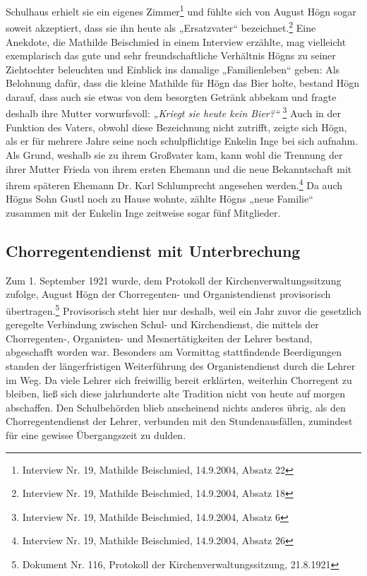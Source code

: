 \documentclass[a4paper]{article}
\newcommand\textstyleZitate[1]{\textit{#1}}
\begin{document}
Schulhaus erhielt sie ein eigenes Zimmer\footnote{ Interview Nr. 19,
Mathilde Beischmied, 14.9.2004, Absatz 22} und fühlte sich von August
Högn sogar soweit akzeptiert, dass sie ihn heute als „Ersatzvater“
bezeichnet.\footnote{ Interview Nr. 19, Mathilde Beischmied, 14.9.2004,
Absatz 18} Eine Anekdote, die Mathilde Beischmied in einem Interview
erzählte, mag vielleicht exemplarisch das gute und sehr
freundschaftliche Verhältnis Högns zu seiner Ziehtochter beleuchten und
Einblick ins damalige „Familienleben“ geben: Als Belohnung dafür, dass
die kleine Mathilde für Högn das Bier holte, bestand Högn darauf, dass
auch sie etwas von dem besorgten Getränk abbekam und fragte deshalb
ihre Mutter vorwurfsvoll: \textstyleZitate{„Kriegt sie heute kein
Bier?“ }\footnote{ Interview Nr. 19, Mathilde Beischmied, 14.9.2004,
Absatz 6} Auch in der Funktion des Vaters, obwohl diese Bezeichnung
nicht zutrifft, zeigte sich Högn, als er für mehrere Jahre seine noch
schulpflichtige Enkelin Inge bei sich aufnahm. Als Grund, weshalb sie
zu ihrem Großvater kam, kann wohl die Trennung der ihrer Mutter Frieda
von ihrem ersten Ehemann und die neue Bekanntschaft mit ihrem späteren
Ehemann Dr. Karl Schlumprecht angesehen werden.\footnote{ Interview Nr.
19, Mathilde Beischmied, 14.9.2004, Absatz 26} Da auch Högns Sohn Gustl
noch zu Hause wohnte, zählte Högns „neue Familie“ zusammen mit der
Enkelin Inge zeitweise sogar fünf Mitglieder.

\subsection{Chorregentendienst mit Unterbrechung}
\hypertarget{RefHeadingToc100333732}{}Zum 1. September 1921 wurde, dem
Protokoll der Kirchenverwaltungssitzung zufolge, August Högn der
Chorregenten- und Organistendienst provisorisch übertragen.\footnote{
Dokument Nr. 116, Protokoll der Kirchenverwaltungssitzung, 21.8.1921}
Provisorisch steht hier nur deshalb, weil ein Jahr zuvor die gesetzlich
geregelte Verbindung zwischen Schul- und Kirchendienst, die mittels der
Chorregenten-, Organisten- und Mesnertätigkeiten der Lehrer bestand,
abgeschafft worden war. Besonders am Vormittag stattfindende
Beerdigungen standen der längerfristigen Weiterführung des
Organistendienst durch die Lehrer im Weg. Da viele Lehrer sich
freiwillig bereit erklärten, weiterhin Chorregent zu bleiben, ließ sich
diese jahrhunderte alte Tradition nicht von heute auf morgen
abschaffen. Den Schulbehörden blieb anscheinend nichts anderes übrig,
als den Chorregentendienst der Lehrer, verbunden mit den
Stundenausfällen, zumindest für eine gewisse Übergangszeit zu dulden.
\end{document}
